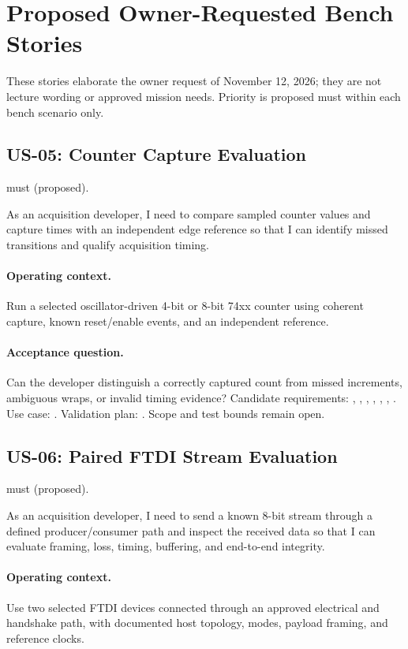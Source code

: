 \section{Proposed Owner-Requested Bench Stories}
These stories elaborate the owner request of November 12, 2026; they are not lecture wording or approved mission needs. Priority is proposed \gls{must} within each bench scenario only.
\subsection{US-05: Counter Capture Evaluation}
\quad\gls{must} (proposed).\par
As an acquisition developer, I need to compare sampled counter values and capture times with an independent edge reference so that I can identify missed transitions and qualify acquisition timing.
\paragraph{Operating context.} Run a selected oscillator-driven 4-bit or 8-bit 74xx counter using coherent capture, known reset/enable events, and an independent reference.
\paragraph{Acceptance question.} Can the developer distinguish a correctly captured count from missed increments, ambiguous wraps, or invalid timing evidence?
\noindent Candidate requirements: , , , , , , . Use case: . Validation plan: . Scope and test bounds remain open.
\subsection{US-06: Paired FTDI Stream Evaluation}
\quad\gls{must} (proposed).\par
As an acquisition developer, I need to send a known 8-bit stream through a defined producer/consumer path and inspect the received data so that I can evaluate framing, loss, timing, buffering, and end-to-end integrity.
\paragraph{Operating context.} Use two selected FTDI devices connected through an approved electrical and handshake path, with documented host topology, modes, payload framing, and reference clocks.
